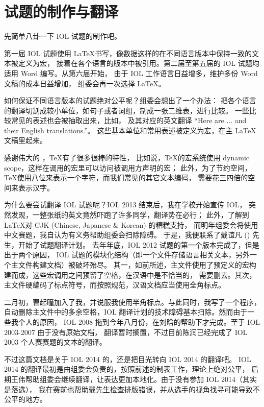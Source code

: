 \section{试题的制作与翻译}

先简单八卦一下 IOL 试题的制作吧。

第一届 IOL 试题使用 \LaTeX 书写，像数据这样的在不同语言版本中保持一致的文本被定义为宏，
接着在各个语言的版本中被引用。第二届至第五届的 IOL 试题均适用 Word 编写。从第六届开始，
由于 IOL 工作语言日益增多，维护多份 Word 文稿的成本日益增加，
组委会再一次选择 \LaTeX\cite{IOLEdit}。

如何保证不同语言版本的试题绝对公平呢？组委会想出了一个办法：
把各个语言的翻译切割成较小单位，如句子或者词组，制成一张二维表，进行比较。
一些比较常见的表述也会被抽取出来，比如，
及其对应的英文翻译 “Here are ... and their English translations.”。
这些基本单位和常用表述被定义为宏，在主 LaTeX 文稿里起来。

感谢伟大的 ，\TeX 有了很多很棒的特性，
比如说，\TeX 的宏系统使用 dynamic scope，这样在调用的宏里可以访问被调用方声明的宏；
此外，为了节约空间，\TeX 使用八位来表示一个字符，而我们常见的其它文本编码，
需要花三四倍的空间来表示汉字。

为什么要尝试翻译 IOL 试题呢？IOL 2013 结束后，我在学校开始宣传 IOL，
突然发现，一整张纸的英文竟然吓跑了许多同学，翻译势在必行；
此外，了解到 \LaTeX 对 CJK (Chinese, Japanese \& Korean) 的糟糕支持，
而明年组委会将使用中文赛题，我自认为有义务帮助组委会扫除障碍。
于是，我便联系了戴谊凡 () 先生，开始了试题翻译计划。
去年年底，IOL 2012 试题的第一个版本完成了，但是出于两个原因，
IOL 试题的模块化结构（即一个文件存储语言相关文本，另外一个主文件构建文档）被破坏殆尽。
其一，如前所述，主文件使用了预定义的宏构建而成，这些宏调用之间预留了空格，在汉语中是不恰当的，
需要删去。其次，主文件硬编码了标点符号，而按照规范，汉语文档应当使用全角标点。

二月初，曹起曈加入了我，并说服我使用半角标点。与此同时，我写了一个程序，
自动删除主文件中的多余空格，IOL 翻译计划的技术障碍基本扫除。然而由于一些我个人的原因，
IOL 2008 拖到今年八月份，在刘晗的帮助下才完成。至于 IOL 2003-2007 由于没有原始文档，
翻译暂时搁置，不过目前陈润已经完成了 IOL 2003 个人赛赛题的文本的翻译。

不过这篇文档是关于 IOL 2014 的，还是把目光转向 IOL 2014 的翻译吧。
IOL 2014 的翻译最初是由组委会负责的，按照前述的制表工作，理论上绝对公平，
后期王伟帮助组委会继续翻译，让表达更加本地化。由于没有参加 IOL 2014（其实是落选），
我在赛前也帮助戴先生检查排版错误，并从选手的视角找寻可能导致不公平的地方。

